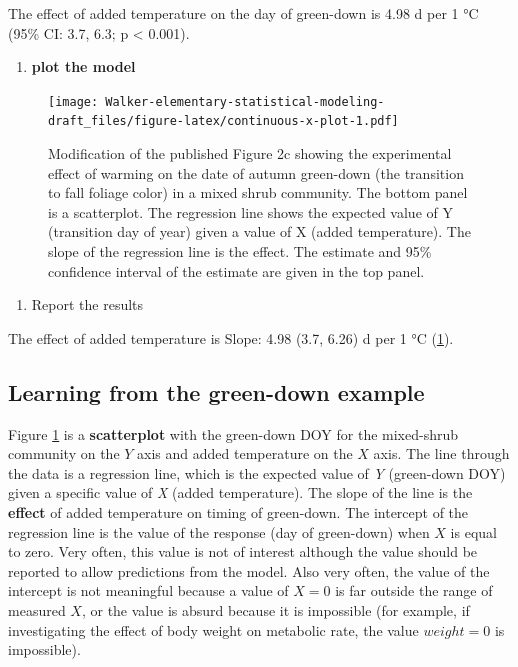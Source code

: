 \documentclass[]{book}
\providecommand{\tightlist}{%
  \setlength{\itemsep}{0pt}\setlength{\parskip}{0pt}}
\begin{document}
The effect of added temperature on the day of green-down is 4.98 d per 1 °C (95\% CI: 3.7, 6.3; p \textless{} 0.001).

\begin{enumerate}
\def\labelenumi{\arabic{enumi}.}
\setcounter{enumi}{5}
\tightlist
\item
  \textbf{plot the model}
\end{enumerate}

\begin{figure}
\centering
\texttt{[image: Walker-elementary-statistical-modeling-draft\_files/figure-latex/continuous-x-plot-1.pdf]}
\caption{\label{fig:continuous-x-plot}Modification of the published Figure 2c showing the experimental effect of warming on the date of autumn green-down (the transition to fall foliage color) in a mixed shrub community. The bottom panel is a scatterplot. The regression line shows the expected value of Y (transition day of year) given a value of X (added temperature). The slope of the regression line is the effect. The estimate and 95\% confidence interval of the estimate are given in the top panel.}
\end{figure}

\begin{enumerate}
\def\labelenumi{\arabic{enumi}.}
\setcounter{enumi}{6}
\tightlist
\item
  Report the results
\end{enumerate}

The effect of added temperature is Slope: 4.98 (3.7, 6.26) d per 1 °C (\ref{fig:continuous-x-plot}).

\hypertarget{learning-from-the-green-down-example}{%
\subsection{Learning from the green-down example}\label{learning-from-the-green-down-example}}

Figure \ref{fig:continuous-x-plot} is a \textbf{scatterplot} with the green-down DOY for the mixed-shrub community on the \(Y\) axis and added temperature on the \(X\) axis. The line through the data is a regression line, which is the expected value of \emph{Y} (green-down DOY) given a specific value of \emph{X} (added temperature). The slope of the line is the \textbf{effect} of added temperature on timing of green-down. The intercept of the regression line is the value of the response (day of green-down) when \(X\) is equal to zero. Very often, this value is not of interest although the value should be reported to allow predictions from the model. Also very often, the value of the intercept is not meaningful because a value of \(X = 0\) is far outside the range of measured \(X\), or the value is absurd because it is impossible (for example, if investigating the effect of body weight on metabolic rate, the value \(weight = 0\) is impossible).
\end{document}
